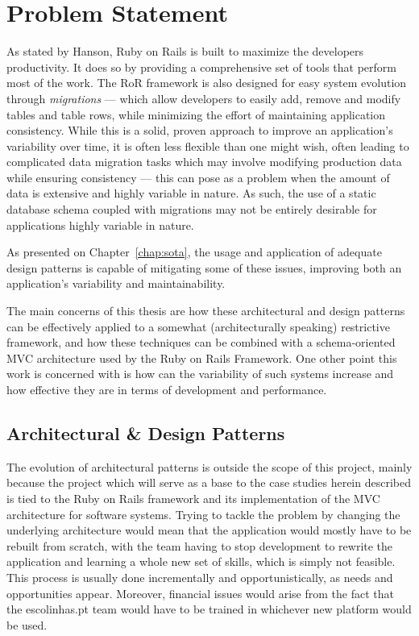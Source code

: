 \chapter{Problem Statement}\label{chap:problem_statement}

As stated by Hanson, Ruby on Rails is built to maximize the developers productivity\cite{rubyonrails}. It does so by providing a comprehensive set of tools that perform most of the work. The RoR framework is also designed for easy system evolution through \emph{migrations} --- which allow developers to easily add, remove and modify tables and table rows, while minimizing the effort of maintaining application consistency. While this is a solid, proven approach to improve an application's variability over time, it is often less flexible than one might wish, often leading to complicated data migration tasks which may involve modifying production data while ensuring consistency --- this can pose as a problem when the amount of data is extensive and highly variable in nature. As such, the use of a static database schema coupled with migrations may not be entirely desirable for applications highly variable in nature.

As presented on Chapter~\ref{chap:sota}, the usage and application of adequate design patterns is capable of mitigating some of these issues, improving both an application's variability and maintainability.

The main concerns of this thesis are how these architectural and design patterns can be effectively applied to a somewhat (architecturally speaking) restrictive framework, and how these techniques can be combined with a schema-oriented MVC architecture used by the Ruby on Rails Framework. One other point this work is concerned with is how can the variability of such systems increase and how effective they are in terms of development and performance.

\section{Architectural \& Design Patterns}\label{sec:architectural_patterns}

The evolution of architectural patterns is outside the scope of this project, mainly because the project which will serve as a base to the case studies herein described is tied to the Ruby on Rails framework and its implementation of the MVC architecture for software systems. Trying to tackle the problem by changing the underlying architecture would mean that the application would mostly have to be rebuilt from scratch, with the team having to stop development to rewrite the application and learning a whole new set of skills, which is simply not feasible. This process is usually done incrementally and opportunistically, as needs and opportunities appear. Moreover, financial issues would arise from the fact that the escolinhas.pt team would have to be trained in whichever new platform would be used.

